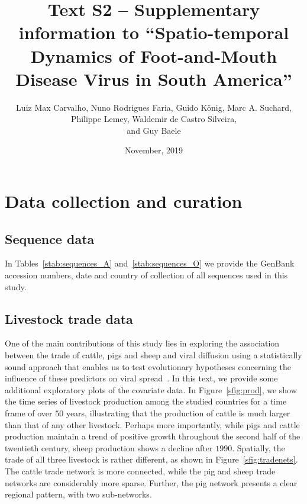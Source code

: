 \documentclass[a4paper,10pt]{article}
\title{Text S2 -- Supplementary information to ``Spatio-temporal Dynamics of Foot-and-Mouth Disease Virus in South America''}
\author{
Luiz Max Carvalho, Nuno Rodrigues Faria, Guido K\"onig,
Marc A. Suchard,\\ 
Philippe Lemey, Waldemir de Castro Silveira,\\
and Guy Baele
}
\date{November, 2019}
\begin{document}
\maketitle

\section*{Data collection and curation}

\subsection*{Sequence data}

In Tables~\ref{stab:sequences_A} and~\ref{stab:sequences_O} we provide the GenBank accession numbers, date and country of collection of all sequences used in this study.

\subsection*{Livestock trade data}

One of the main contributions of this study lies in exploring the association between the trade of cattle, pigs and sheep and viral diffusion using a statistically sound approach that enables us to test evolutionary hypotheses concerning the influence of these predictors on viral spread~\citep{M-Lemey2014}. %
In this text, we provide some additional exploratory plots of the covariate data.
In Figure~\ref{sfig:prod}, we show the time series of livestock production among the studied countries for a time frame of over $50$ years, illustrating that the production of cattle is much larger than that of any other livestock. %
Perhaps more importantly, while pigs and cattle production maintain a trend of positive growth throughout the second half of the twentieth century, sheep production shows a decline after $1990$.
Spatially, the trade of all three livestock is rather different, as shown in Figure~\ref{sfig:tradenets}. %
The cattle trade network is more connected, while the pig and sheep trade networks are considerably more sparse.
Further, the pig network presents a clear regional pattern, with two sub-networks. %
\end{document}

